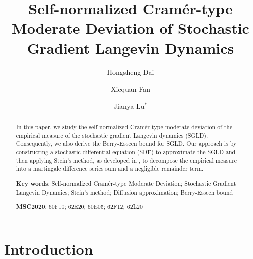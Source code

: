 \documentclass[12pt]{amsart}
\theoremstyle{definition}
\theoremstyle{remark}
\numberwithin{equation}{section}
\begin{document}
\title[]
{Self-normalized Cram\'er-type Moderate Deviation of Stochastic Gradient Langevin Dynamics}

\author[H. Dai]{Hongsheng Dai}
\address[H. Dai]{School of Mathematics, Statistics and Physics, Newcastle University, UK}

\author[X. Fan]{Xiequan Fan}
\address[X. Fan]{School of Mathematics and Statistics, Northeastern University at Qinhuangdao, China}


\author[J. Lu]{Jianya Lu$^*$}
\address[J. Lu]{School of Mathematics, Statistics and Actuarial Science, University of Essex, UK}




\maketitle

\begin{abstract}

In this paper, we study the self-normalized Cram\'er-type moderate deviation of the empirical measure of the stochastic gradient Langevin dynamics (SGLD). Consequently, we also derive the Berry-Esseen bound for SGLD. Our approach is by constructing a stochastic differential equation (SDE) to approximate the SGLD and then applying Stein’s method, as developed in \cite{FSX19, Lu2022central},  to decompose the empirical measure into a martingale difference series sum and a negligible remainder term.


{\bf Key words}: Self-normalized Cram\'er-type Moderate Deviation; Stochastic Gradient Langevin Dynamics; Stein's method; Diffusion approximation; Berry-Esseen bound  
	
{\bf MSC2020}: 60F10; 62E20; 60E05; 62F12; 62L20 
\end{abstract}






\section{Introduction}\label{sec:intro}
\end{document}
